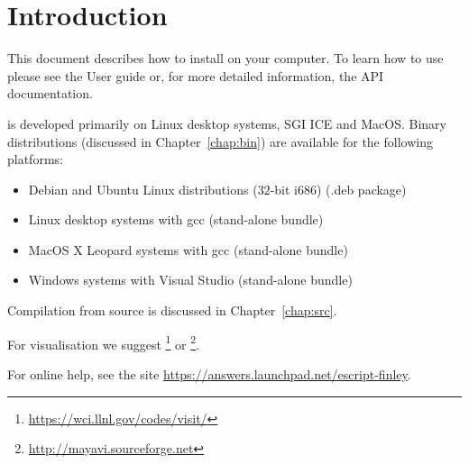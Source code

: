 

%
%
%

\section*{Introduction}
This document describes how to install \esfinley on your computer.
To learn how to use \esfinley please see the User guide or, for
more detailed information, the API documentation.

\esfinley is developed primarily on Linux desktop systems,  SGI ICE and MacOS.
Binary distributions (discussed in Chapter~\ref{chap:bin}) are available for the following platforms:
\begin{itemize}
\item Debian and Ubuntu Linux distributions ($32$-bit i686) (.deb package)
\item Linux desktop systems with gcc (stand-alone bundle)
\item MacOS X Leopard systems with gcc (stand-alone bundle)
\item Windows systems with Visual Studio (stand-alone bundle) 
\end{itemize}

Compilation from source is discussed in Chapter~\ref{chap:src}.

For visualisation we suggest \footnote{\url{https://wci.llnl.gov/codes/visit/}} or \footnote{\url{http://mayavi.sourceforge.net}}.

For online help, see the site \url{https://answers.launchpad.net/escript-finley}.